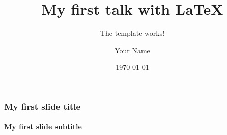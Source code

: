 \documentclass[t,handout]{beamer}
\title{My first talk with \LaTeX{}}
\subtitle{The template works!}
\author{Your Name}
\institute{Your Institute}
\date{\today}
\begin{document}
\maketitle

\begin{frame}
  \frametitle{My first slide title}
  \framesubtitle{My first slide subtitle}
\end{frame}
\end{document}
